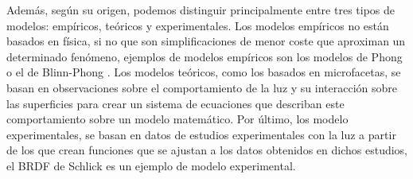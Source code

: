     Adem\'as, seg\'un su origen, podemos distinguir principalmente entre tres tipos de modelos: emp\'iricos, te\'oricos y
    experimentales. Los modelos emp\'iricos no est\'an basados en f\'isica, si no que son simplificaciones de menor coste que
    aproximan un determinado fen\'omeno, ejemplos de modelos emp\'iricos son los modelos de Phong \autocite{phong} o el
    de Blinn-Phong \autocite{blinnphong}. Los modelos te\'oricos, como los basados en microfacetas, se basan en observaciones sobre el comportamiento de la luz y su
    interacci\'on sobre las superficies para crear un sistema de ecuaciones que describan este comportamiento sobre un modelo
    matem\'atico. Por \'ultimo, los modelo experimentales, se basan en datos de estudios experimentales con la luz a partir de los
    que crean funciones que se ajustan a los datos obtenidos en dichos estudios, el BRDF de Schlick es un ejemplo de modelo
    experimental.


